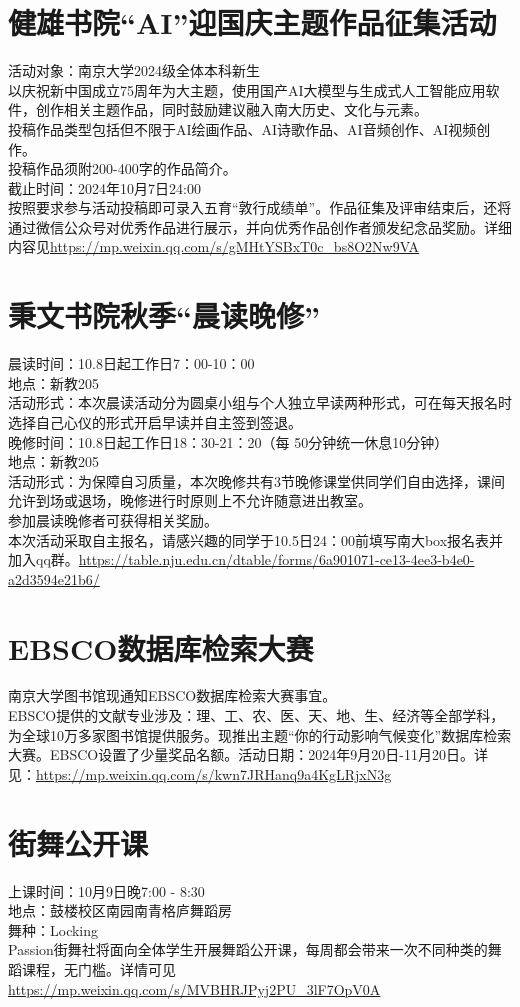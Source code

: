 \documentclass[letterpaper, 12pt]{article}
\begin{document}
\begin{multicols}{2}
\section{健雄书院“AI”迎国庆主题作品征集活动}
活动对象：南京大学2024级全体本科新生\\
以庆祝新中国成立75周年为大主题，使用国产AI大模型与生成式人工智能应用软件，创作相关主题作品，同时鼓励建议融入南大历史、文化与元素。\\
投稿作品类型包括但不限于AI绘画作品、AI诗歌作品、AI音频创作、AI视频创作。\\
投稿作品须附200-400字的作品简介。\\
截止时间：2024年10月7日24:00\\
按照要求参与活动投稿即可录入五育“敦行成绩单”。作品征集及评审结束后，还将通过微信公众号对优秀作品进行展示，并向优秀作品创作者颁发纪念品奖励。详细内容见\url{https://mp.weixin.qq.com/s/gMHtYSBxT0c_bs8O2Nw9VA}
\section{秉文书院秋季“晨读晚修”}
晨读时间：10.8日起工作日7：00-10：00\\
地点：新教205\\
活动形式：本次晨读活动分为圆桌小组与个人独立早读两种形式，可在每天报名时选择自己心仪的形式开启早读并自主签到签退。\\
晚修时间：10.8日起工作日18：30-21：20（每 50分钟统一休息10分钟）\\
地点：新教205\\
活动形式：为保障自习质量，本次晚修共有3节晚修课堂供同学们自由选择，课间允许到场或退场，晚修进行时原则上不允许随意进出教室。
\\参加晨读晚修者可获得相关奖励。
\\本次活动采取自主报名，请感兴趣的同学于10.5日24：00前填写南大box报名表并加入qq群。\url{https://table.nju.edu.cn/dtable/forms/6a901071-ce13-4ee3-b4e0-a2d3594e21b6/}
\section{EBSCO数据库检索大赛}
南京大学图书馆现通知EBSCO数据库检索大赛事宜。\\
EBSCO提供的文献专业涉及：理、工、农、医、天、地、生、经济等全部学科，为全球10万多家图书馆提供服务。现推出主题“你的行动影响气候变化”数据库检索大赛。EBSCO设置了少量奖品名额。活动日期：2024年9月20日-11月20日。详见：\url{https://mp.weixin.qq.com/s/kwn7JRHanq9a4KgLRjxN3g}\\
\section{街舞公开课}
上课时间：10月9日晚7:00 - 8:30\\
地点：鼓楼校区南园南青格庐舞蹈房\\
舞种：Locking\\
Passion街舞社将面向全体学生开展舞蹈公开课，每周都会带来一次不同种类的舞蹈课程，无门槛。详情可见
\url{https://mp.weixin.qq.com/s/MVBHRJPyj2PU_3lF7OpV0A}\\

\end{multicols}
\end{document}

